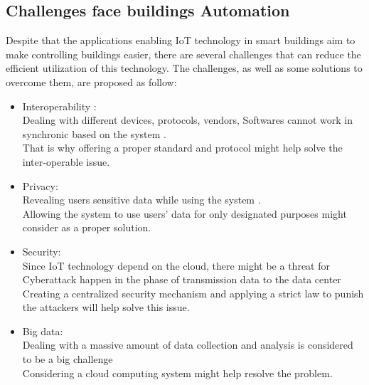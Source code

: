 \documentclass[conference]{IEEEtran}
\begin{document}
\subsection{Challenges face buildings Automation }

Despite that the applications enabling  IoT technology in smart buildings aim to make controlling buildings easier, there are several challenges that can reduce the efficient utilization of this technology. The challenges, as well as some solutions to overcome them, are proposed as follow: \cite{mic1}\\

\begin{itemize}
	
	\item Interoperability :\\
Dealing with different devices, protocols, vendors, Softwares cannot work in synchronic based on the system .\\
That is why offering a proper standard and protocol might help solve the inter-operable issue. \\


\item Privacy:\\
Revealing users sensitive data while using the system .\\
Allowing the system to use users' data for only designated purposes might consider as a proper solution. \\

\item Security: \\
Since IoT technology depend on the cloud, there might be a threat for Cyberattack happen in the phase of transmission data to the data center\\

Creating a centralized security mechanism and applying a strict law to punish the attackers will help solve this issue.\\

\item Big data:\\
Dealing with a massive amount of data collection and analysis is considered to be a big challenge  \\
Considering a cloud computing system might help resolve the problem. 
	 

	
\end{itemize}
\end{document}
